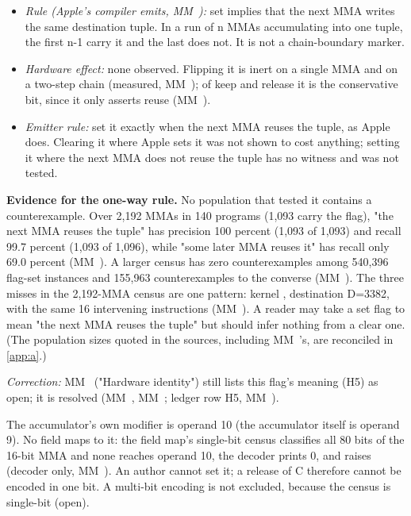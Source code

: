 \begin{itemize}
\item \emph{Rule (Apple's compiler emits, MM~):} set implies that the next MMA writes the same destination tuple. In a
  run of n MMAs accumulating into one tuple, the first n-1 carry it and the last does not. It is not a chain-boundary
  marker.
\item \emph{Hardware effect:} none observed. Flipping it is inert on a single MMA and on a two-step chain (measured, MM~);
  of keep and release it is the conservative bit, since it only asserts reuse (MM~).
\item \emph{Emitter rule:} set it exactly when the next MMA reuses the tuple, as Apple does. Clearing it where
  Apple sets it was not shown to cost anything; setting it where the next MMA does not reuse the tuple has no witness
  and was not tested.
\end{itemize}

\textbf{Evidence for the one-way rule.} No population that tested it contains a counterexample. Over 2,192 MMAs in 140 programs
(1,093 carry the flag), "the next MMA reuses the tuple" has precision 100 percent (1,093 of 1,093) and recall 99.7
percent (1,093 of 1,096), while "some later MMA reuses it" has recall only 69.0 percent (MM~). A larger census
has zero counterexamples among 540,396 flag-set instances and 155,963 counterexamples to the converse (MM~). The three
misses in the 2,192-MMA census are one pattern: kernel , destination D=3382, with the same 16 intervening
 instructions (MM~). A reader may take a set flag to mean "the next MMA reuses the
tuple" but should infer nothing from a clear one. (The population sizes quoted in the sources, including MM~'s, are reconciled in
\cref{app:a}.)

\emph{Correction:} MM~ ("Hardware identity") still lists this flag's meaning (H5) as open; it is resolved (MM~,
MM~; ledger row H5, MM~).

The accumulator's own modifier is operand 10 (the accumulator itself is operand 9). No field maps to it: the field
map's single-bit census classifies all 80 bits of the 16-bit MMA and none reaches operand 10, the decoder prints 0, and
 raises (decoder only, MM~). An author cannot set it; a release of C therefore cannot be
encoded in one bit. A multi-bit encoding is not excluded, because the census is single-bit (open).

